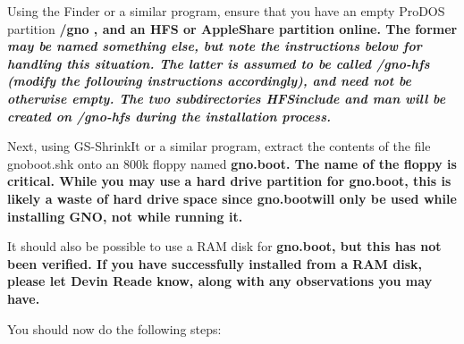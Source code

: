 \documentclass{report}
\begin{document}
Using the Finder or a similar program, ensure that you have an empty ProDOS 
partition \bf /gno \rm, and an HFS or AppleShare partition online.  The
former \em may \rm  be named something else, but note the instructions
below for handling this situation.  The latter is assumed to be called
\bf /gno-hfs \rm  (modify the following instructions accordingly), and
need not be otherwise empty.  The two subdirectories \bf HFSinclude \rm
and \bf man \rm  will be created on \bf /gno-hfs  \rm during the installation
process.

Next, using GS-ShrinkIt or a similar program, extract the contents of the
file gnoboot.shk onto an 800k floppy named \bf gno.boot\rm.  
The name of the floppy is critical.  While you may use a hard drive 
partition for \bf gno.boot\rm, this is likely a waste of hard drive space
since \bf gno.boot\rm  will only be used while installing GNO, not while
running it.

It should also be possible to use a RAM disk for \bf gno.boot\rm, but
this has not been verified.  If you have successfully installed from a
RAM disk, please let Devin Reade know, along with any observations
you may have.

You should now do the following steps:

\begin{comment}

If your volumes are named something else, replace the names in the cd commands
below with the appropriate name.
 
\end{comment}
\end{document}
